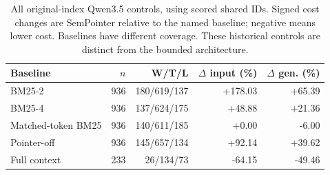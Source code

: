 \begin{table}[htbp]
\centering
\small
\setlength{\tabcolsep}{4pt}
\caption{All original-index Qwen3.5 controls, using scored shared IDs. Signed cost changes are SemPointer relative to the named baseline; negative means lower cost. Baselines have different coverage. These historical controls are distinct from the bounded architecture.}
\label{tab:original-controls}
\begin{tabular}{lrrrr}
\toprule
Baseline & $n$ & W/T/L & $\Delta$ input (\%) & $\Delta$ gen. (\%) \\
\midrule
BM25-2 & 936 & 180/619/137 & +178.03 & +65.39 \\
BM25-4 & 936 & 137/624/175 & +48.88 & +21.36 \\
Matched-token BM25 & 936 & 140/611/185 & +0.00 & -6.00 \\
Pointer-off & 936 & 145/657/134 & +92.14 & +39.62 \\
Full context & 233 & 26/134/73 & -64.15 & -49.46 \\
\bottomrule
\end{tabular}
\end{table}
